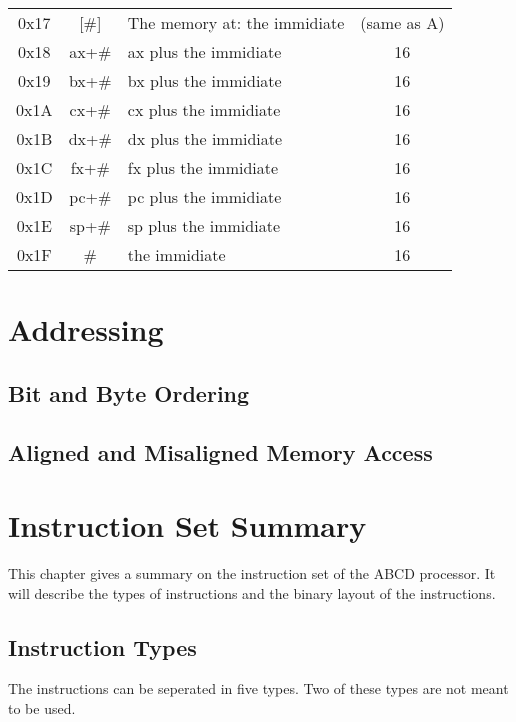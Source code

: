 \documentclass[oneside, a4paper]{memoir}
\begin{document}
\begin{center}
\begin{longtable}{cclc}
0x17 & [\#]     & The memory at: the immidiate & (same as A) \\
0x18 & ax+\# & ax plus the immidiate & 16 \\
0x19 & bx+\# & bx plus the immidiate & 16 \\
0x1A & cx+\# & cx plus the immidiate & 16 \\
0x1B & dx+\# & dx plus the immidiate & 16 \\
0x1C & fx+\# & fx plus the immidiate & 16 \\
0x1D & pc+\# & pc plus the immidiate & 16 \\
0x1E & sp+\# & sp plus the immidiate & 16 \\
0x1F & \#    & the immidiate & 16 \\
\end{longtable}
\end{center}


\chapter{Addressing}
\label{ch:Addressing}
\section{Bit and Byte Ordering}
\section{Aligned and Misaligned Memory Access}


\chapter{Instruction Set Summary}
This chapter gives a summary on the instruction set of the ABCD processor. It will describe the types of instructions and the binary layout of the instructions.
\section{Instruction Types}
The instructions can be seperated in five types. Two of these types are not meant to be used. 
\end{document}
